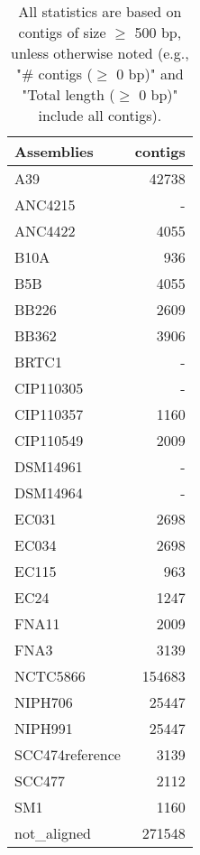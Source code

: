 \documentclass[12pt,a4paper]{article}
\begin{document}
\begin{table}[ht]
\begin{center}
\caption{All statistics are based on contigs of size $\geq$ 500 bp, unless otherwise noted (e.g., "\# contigs ($\geq$ 0 bp)" and "Total length ($\geq$ 0 bp)" include all contigs).}
\begin{tabular}{|l*{1}{|r}|}
\hline
Assemblies & contigs \\ \hline
A39 & 42738 \\ \hline
ANC4215 & - \\ \hline
ANC4422 & 4055 \\ \hline
B10A & 936 \\ \hline
B5B & 4055 \\ \hline
BB226 & 2609 \\ \hline
BB362 & 3906 \\ \hline
BRTC1 & - \\ \hline
CIP110305 & - \\ \hline
CIP110357 & 1160 \\ \hline
CIP110549 & 2009 \\ \hline
DSM14961 & - \\ \hline
DSM14964 & - \\ \hline
EC031 & 2698 \\ \hline
EC034 & 2698 \\ \hline
EC115 & 963 \\ \hline
EC24 & 1247 \\ \hline
FNA11 & 2009 \\ \hline
FNA3 & 3139 \\ \hline
NCTC5866 & 154683 \\ \hline
NIPH706 & 25447 \\ \hline
NIPH991 & 25447 \\ \hline
SCC474reference & 3139 \\ \hline
SCC477 & 2112 \\ \hline
SM1 & 1160 \\ \hline
not\_aligned & 271548 \\ \hline
\end{tabular}
\end{center}
\end{table}
\end{document}
